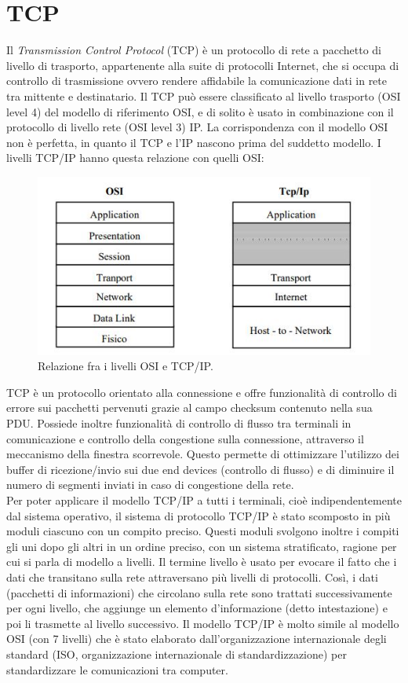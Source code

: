 \documentclass[12pt, a4paper, oneside]{book}
\begin{document}
\section{TCP}
Il \textit{Transmission Control Protocol} (TCP) \cite{TCP} è un protocollo di rete a pacchetto di livello di trasporto, appartenente alla suite di protocolli Internet, che si occupa di controllo di trasmissione ovvero rendere affidabile la comunicazione dati in rete tra mittente e destinatario. Il TCP può essere classificato al livello trasporto (OSI level 4) del modello di riferimento OSI, e di solito è usato in combinazione con il protocollo di livello rete (OSI level 3) IP. La corrispondenza con il modello OSI non è perfetta, in quanto il TCP e l'IP nascono prima del suddetto modello. I livelli TCP/IP hanno questa relazione con quelli OSI:
\begin{figure}[H]
	\centering
	\includegraphics[width=12cm]{Immagini/1}
	\caption{ Relazione fra i livelli OSI e TCP/IP.}
\end{figure}
TCP è un protocollo orientato alla connessione e offre funzionalità di controllo di errore sui pacchetti pervenuti grazie al campo checksum contenuto nella sua PDU. Possiede inoltre funzionalità di controllo di flusso tra terminali in comunicazione e controllo della congestione sulla connessione, attraverso il meccanismo della finestra scorrevole. Questo permette di ottimizzare l'utilizzo dei buffer di ricezione/invio sui due end devices (controllo di flusso) e di diminuire il numero di segmenti inviati in caso di congestione della rete.
\\Per poter applicare il modello TCP/IP a tutti i terminali, cioè indipendentemente dal sistema operativo, il sistema di protocollo TCP/IP è stato scomposto in più moduli ciascuno con un compito preciso. Questi moduli svolgono inoltre i compiti gli uni dopo gli altri in un ordine preciso, con un sistema stratificato, ragione per cui si parla di modello a livelli. Il termine livello è usato per evocare il fatto che i dati che transitano sulla rete attraversano più livelli di protocolli. Così, i dati (pacchetti di informazioni) che circolano sulla rete sono trattati successivamente per ogni livello, che aggiunge un elemento d'informazione (detto intestazione) e poi li trasmette al livello successivo. Il modello TCP/IP è molto simile al modello OSI (con 7 livelli) che è stato elaborato dall'organizzazione internazionale degli standard (ISO, organizzazione internazionale di standardizzazione) per standardizzare le comunicazioni tra computer. 
\end{document}
